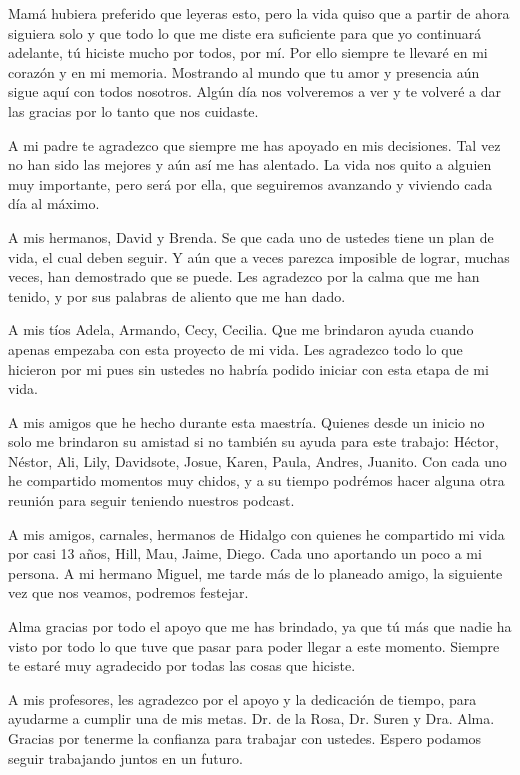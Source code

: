 
Mamá hubiera preferido que leyeras esto, pero la vida quiso que a partir de ahora  siguiera solo y que todo lo que me diste era suficiente para que yo continuará adelante, tú hiciste mucho por todos, por mí. Por ello siempre te llevaré en mi corazón y en mi memoria. Mostrando al mundo que tu amor y presencia aún sigue aquí con todos nosotros. Algún día nos volveremos a ver y te volveré a dar las gracias por lo tanto que nos cuidaste.
\vspace{0.5cm}

A mi padre te agradezco que siempre me has apoyado en mis decisiones. Tal vez no han sido las mejores y aún así me has alentado. La vida nos quito a alguien muy importante, pero será por ella, que seguiremos avanzando y viviendo cada día al máximo.
\vspace{0.5cm}

A mis hermanos, David y Brenda. Se que cada uno de ustedes tiene un plan de vida, el cual deben seguir. Y aún que a veces parezca imposible de lograr, muchas veces, han demostrado que se puede. Les agradezco por la calma que me han tenido, y por sus palabras de aliento que me han dado.
\vspace{0.5cm}

A mis tíos Adela, Armando, Cecy, Cecilia. Que me brindaron ayuda cuando apenas empezaba con esta proyecto de mi vida. Les agradezco todo lo que hicieron por mi pues sin ustedes no habría podido iniciar con esta etapa de mi vida.
\vspace{0.5cm}

A mis amigos que he hecho durante esta maestría. Quienes desde un inicio no solo me brindaron su amistad si no también su ayuda para este trabajo: Héctor, Néstor, Ali, Lily, Davidsote, Josue, Karen, Paula, Andres, Juanito. Con cada uno he compartido momentos muy chidos, y a su tiempo podrémos hacer alguna otra reunión para seguir teniendo nuestros podcast.
\vspace{0.5cm}

A mis amigos, carnales, hermanos de Hidalgo con quienes he compartido mi vida por casi 13 años, Hill, Mau, Jaime, Diego. Cada uno aportando un poco a mi persona. A mi hermano Miguel, me tarde más de lo planeado amigo, la siguiente vez que nos veamos, podremos festejar.
\vspace{0.5cm}

Alma gracias por todo el apoyo que me has brindado, ya que tú más que nadie ha visto por todo lo que tuve que pasar para poder llegar a este momento. Siempre te estaré muy agradecido por todas las cosas que hiciste.
\vspace{0.5cm}

A mis profesores, les agradezco por el apoyo y la dedicación de tiempo, para ayudarme a cumplir una de mis metas. Dr. de la Rosa, Dr. Suren y Dra. Alma. Gracias por tenerme la confianza para trabajar con ustedes. Espero podamos seguir trabajando juntos en un futuro.

 